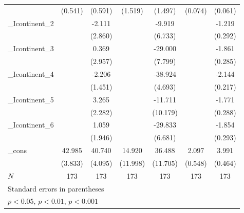 {\begin{tabular}{l*{6}{c}}
            &     (0.541)         &     (0.591)         &     (1.519)         &     (1.497)         &     (0.074)         &     (0.061)         \\
[1em]
\_Icontinent\_2&                     &      -2.111         &                     &      -9.919         &                     &      -1.219\sym{***}\\
            &                     &     (2.860)         &                     &     (6.733)         &                     &     (0.292)         \\
[1em]
\_Icontinent\_3&                     &       0.369         &                     &     -29.000\sym{***}&                     &      -1.861\sym{***}\\
            &                     &     (2.957)         &                     &     (7.799)         &                     &     (0.285)         \\
[1em]
\_Icontinent\_4&                     &      -2.206         &                     &     -38.924\sym{***}&                     &      -2.144\sym{***}\\
            &                     &     (1.451)         &                     &     (4.693)         &                     &     (0.217)         \\
[1em]
\_Icontinent\_5&                     &       3.265         &                     &     -11.711         &                     &      -1.771\sym{***}\\
            &                     &     (2.282)         &                     &    (10.179)         &                     &     (0.288)         \\
[1em]
\_Icontinent\_6&                     &       1.059         &                     &     -29.833\sym{***}&                     &      -1.854\sym{***}\\
            &                     &     (1.946)         &                     &     (6.681)         &                     &     (0.293)         \\
[1em]
\_cons      &      42.985\sym{***}&      40.740\sym{***}&      14.920         &      36.488\sym{**} &       2.097\sym{***}&       3.991\sym{***}\\
            &     (3.833)         &     (4.095)         &    (11.998)         &    (11.705)         &     (0.548)         &     (0.464)         \\
\hline
\(N\)       &         173         &         173         &         173         &         173         &         173         &         173         \\
\hline\hline
\multicolumn{7}{l}{\footnotesize Standard errors in parentheses}\\
\multicolumn{7}{l}{\footnotesize \sym{*} \(p<0.05\), \sym{**} \(p<0.01\), \sym{***} \(p<0.001\)}\\
\end{tabular}
}
